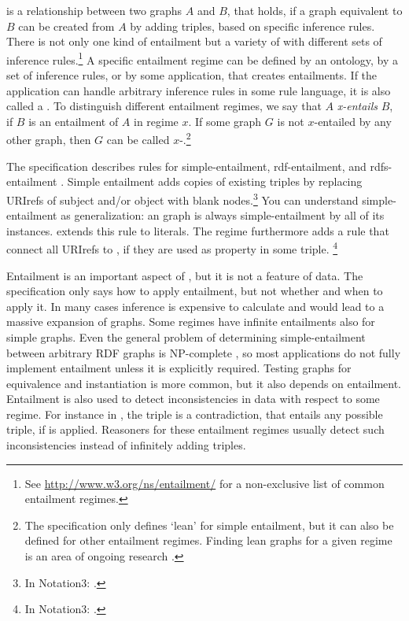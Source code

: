 \label{page:entailment}  is a relationship between two
 graphs $A$ and $B$, that holds, if a graph equivalent to $B$ can be
created from $A$ by adding triples, based on specific inference rules. There is
not only one kind of entailment but a variety of  with
different sets of inference rules.\footnote{See
\url{http://www.w3.org/ns/entailment/} for a non-exclusive list of common
entailment regimes.} A specific entailment regime can be defined by an
ontology, by a set of inference rules, or by some application, that creates
entailments. If the application can handle arbitrary inference rules in some
rule language, it is also called a . To distinguish different
entailment regimes, we say that $A$ \emph{x-entails} $B$, if $B$ is an
entailment of $A$ in regime $x$.  If some graph $G$ is not $x$-entailed by any
other graph, then $G$ can be called $x$-.\footnote{The 
specification only defines `lean' for simple entailment, but it can also be
defined for other entailment regimes. Finding lean graphs for a given regime is
an area of ongoing research \cite{Pichler2010}.}

The  specification describes rules for simple-entailment,
rdf-entailment, and rdfs-entailment \cite[sec. 7]{Hayes2004}.
Simple entailment adds copies of existing triples by replacing
URIrefs of subject and/or object with blank nodes.\footnote{In Notation3:
.} 
You can understand simple-entailment as generalization: an 
 graph is always simple-entailment by all of its 
instances.  extends this rule to literals. The
regime furthermore adds a rule that connect all URIrefs to 
, if they are used as property in some triple.%
\footnote{In Notation3: .}

Entailment is an important aspect of , but it is not a feature of
 data. The  specification only says how to apply
entailment, but not whether and when to apply it.  In many cases inference is
expensive to calculate and would lead to a massive expansion of graphs. Some
regimes have infinite entailments also for simple graphs. Even the general
problem of determining simple-entailment between arbitrary RDF graphs is
NP-complete \cite{Hayes2004}, so most applications do not fully implement
entailment unless it is explicitly required. Testing graphs for equivalence
and instantiation is more common, but it also depends on entailment.
Entailment is also used to detect inconsistencies in  data with
respect to some regime. For instance in , the triple 
 is a contradiction, that entails any 
possible triple, if  is applied. Reasoners for these 
entailment regimes usually detect such inconsistencies instead of infinitely 
adding triples.


